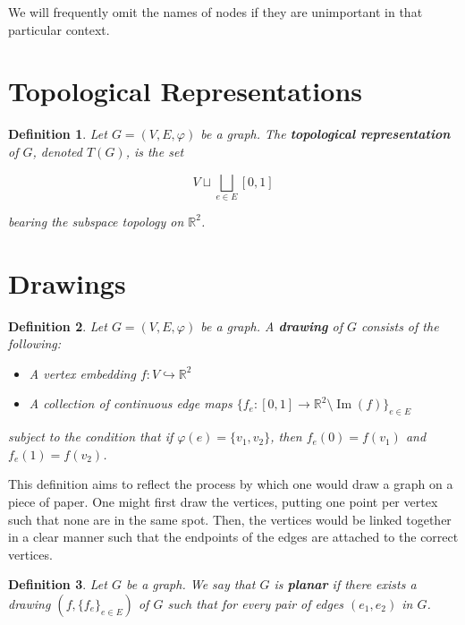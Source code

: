 \documentclass{amsart}
\newtheorem{definition}{Definition}[section]
\renewcommand{\Im}{\operatorname{Im}}
\begin{document}
We will frequently omit the names of nodes if they are unimportant in that
particular context.


\section{Topological Representations}

\begin{definition}
  Let \(G = (V, E, \varphi)\) be a graph. The \textbf{topological
  representation} of \(G\), denoted \(T(G)\), is the set

  \begin{equation*}
    V \sqcup \bigsqcup_{e \in E} [0, 1]
  \end{equation*}

  bearing the subspace topology on \(\mathbb{R}^2\).
\end{definition}

\section{Drawings}

\begin{definition}
  Let \(G = (V, E, \varphi)\) be a graph. A \textbf{drawing} of \(G\) consists
  of the following:
  
  \begin{itemize}
    \item A vertex embedding \(f : V \hookrightarrow \mathbb{R}^2\)
    \item A collection of continuous edge maps \(\{f_e : [0, 1] \to
      \mathbb{R}^2 \setminus \Im(f)\}_{e \in E}\)
  \end{itemize}

  subject to the condition that if \(\varphi(e) = \{v_1, v_2\}\), then \(f_e(0)
  = f(v_1)\) and \(f_e(1) = f(v_2)\).
\end{definition}

This definition aims to reflect the process by which one would draw a graph on
a piece of paper. One might first draw the vertices, putting one point per
vertex such that none are in the same spot. Then, the vertices would be linked
together in a clear manner such that the endpoints of the edges are attached to
the correct vertices.

\begin{definition}
  Let \(G\) be a graph. We say that \(G\) is \textbf{planar} if there exists a
  drawing \((f, \{f_e\}_{e \in E})\) of \(G\) such that for every pair of edges
  \((e_1, e_2)\) in \(G\).
\end{definition}
\end{document}
